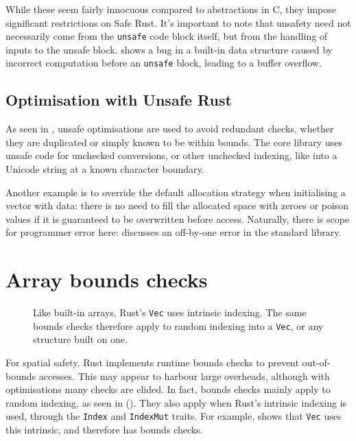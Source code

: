 \documentclass[dissertation.tex]{subfiles}
\begin{document}
While these seem fairly innocuous compared to abstractions in C, they impose
significant restrictions on Safe Rust.
It's important to note that unsafety need not necessarily come from
the \texttt{unsafe} code block itself, but from the handling of inputs
to the unsafe block.
 shows a bug in a built-in data structure
caused by incorrect computation before an \texttt{unsafe} block, leading
to a buffer overflow.

\subsection{Optimisation with Unsafe Rust}
As seen in , unsafe optimisations are used to
avoid redundant checks, whether they are duplicated or simply known to
be within bounds.
The core library uses unsafe code for unchecked conversions,
or other unchecked indexing, like into a Unicode string at a known
character boundary.

Another example is to override the default allocation strategy
when initialising a vector with data: there is no need to fill the
allocated space with zeroes or poison values if it is guaranteed to be
overwritten before access.
Naturally, there is scope for programmer error here:
 discusses an off-by-one error in
the standard library.


\section{Array bounds checks}
\label{sec:rust-elision}

\begin{figure}[ht]
    
    \caption{
        Like built-in arrays, Rust's \texttt{Vec} uses intrinsic
        indexing.
        The same bounds checks therefore apply to random indexing into a
        \texttt{Vec}, or any structure built on one.
    }
    \label{lst:rust-vec-index}
\end{figure}

For spatial safety, Rust implements runtime bounds checks to
prevent out-of-bounds accesses.
This may appear to harbour large overheads, although with optimisations
many checks are elided.
In fact, bounds checks mainly apply to random indexing, as seen in
 ().
They also apply when Rust's intrinsic indexing is used, through the
\texttt{Index} and \texttt{IndexMut} traits.
For example,  shows that \texttt{Vec} uses
this intrinsic, and therefore has bounds checks.
\end{document}
